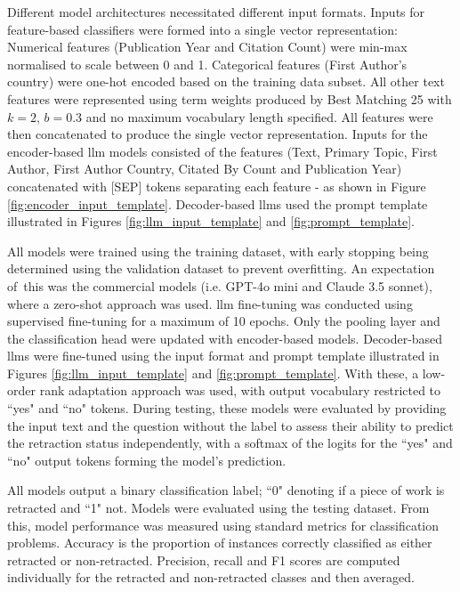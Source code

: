 \documentclass[pdflatex,sn-mathphys-num]{sn-jnl}%
\begin{document}
Different model architectures necessitated different input formats. Inputs for feature-based classifiers were formed into a single vector representation: Numerical features (Publication Year and Citation Count) were min-max normalised to scale between 0 and 1. Categorical features (First Author's country) were one-hot encoded based on the training data subset. All other text features were represented using term weights produced by Best Matching 25 \cite{INR-019} with $k = 2$, $b = 0.3$ and no maximum vocabulary length specified. All features were then concatenated to produce the single vector representation. Inputs for the encoder-based \gls*{llm} models consisted of the features (Text, Primary Topic, First Author, First Author Country, Citated By Count and Publication Year) concatenated with [SEP] tokens separating each feature - as shown in Figure \ref{fig:encoder_input_template}. Decoder-based \glspl*{llm}  used the prompt template illustrated in Figures \ref{fig:llm_input_template} and \ref{fig:prompt_template}.

All models were trained using the training dataset, with early stopping being determined using the validation dataset to prevent overfitting. An expectation of this was the commercial models (i.e. GPT-4o mini and Claude 3.5 sonnet), where a zero-shot approach was used. \gls*{llm} fine-tuning was conducted using supervised fine-tuning for a maximum of 10 epochs. Only the pooling layer and the classification head were updated with encoder-based models. Decoder-based \glspl*{llm} were fine-tuned using the input format and prompt template illustrated in Figures \ref{fig:llm_input_template} and \ref{fig:prompt_template}. With these, a low-order rank adaptation approach was used, with output vocabulary restricted to ``yes" and ``no" tokens. During testing, these models were evaluated by providing the input text and the question without the label to assess their ability to predict the retraction status independently, with a softmax of the logits for the ``yes" and ``no" output tokens forming the model's prediction.  

All models output a binary classification label; ``0" denoting if a piece of work is retracted and ``1" not. Models were evaluated using the testing dataset. From this, model performance was measured using standard metrics for classification problems. Accuracy is the proportion of instances correctly classified as either retracted or non-retracted. Precision, recall and F1 scores are computed individually for the retracted and non-retracted classes and then averaged. 
\end{document}
